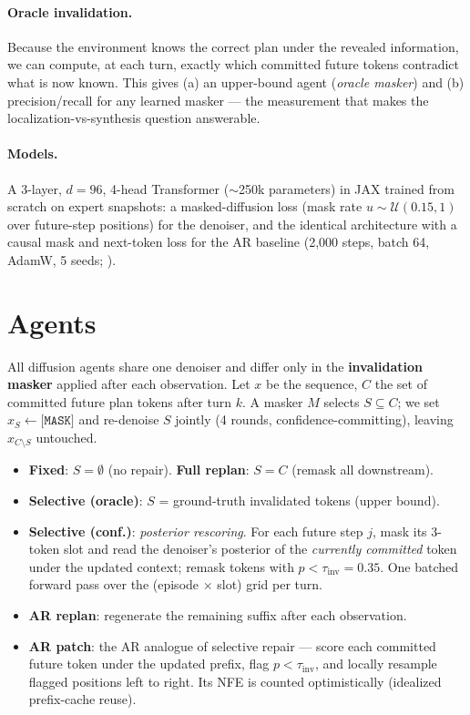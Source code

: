 \documentclass{article}
\newcommand{\tinv}{\tau_{\mathrm{inv}}}
\begin{document}
\paragraph{Oracle invalidation.} Because the environment knows the correct plan under the revealed
information, we can compute, at each turn, exactly which committed future tokens contradict what is
now known. This gives (a) an upper-bound agent (\emph{oracle masker}) and (b) precision/recall for
any learned masker --- the measurement that makes the localization-vs-synthesis question answerable.

\paragraph{Models.} A 3-layer, $d{=}96$, 4-head Transformer ($\sim$250k parameters) in JAX trained
from scratch on expert snapshots: a masked-diffusion loss (mask rate $u\!\sim\!\mathcal{U}(0.15,1)$
over future-step positions) for the denoiser, and the identical architecture with a causal mask and
next-token loss for the AR baseline (2{,}000 steps, batch 64, AdamW, 5 seeds; ).

\section{Agents}\label{sec:agents}

All diffusion agents share one denoiser and differ only in the \textbf{invalidation masker} applied
after each observation. Let $x$ be the sequence, $C$ the set of committed future plan tokens after
turn $k$. A masker $M$ selects $S\subseteq C$; we set $x_S \leftarrow \texttt{[MASK]}$ and re-denoise
$S$ jointly (4 rounds, confidence-committing), leaving $x_{C\setminus S}$ untouched.

\vspace{-0.3em}
\begin{itemize}\itemsep1pt \parskip0pt
\item \textbf{Fixed}: $S=\emptyset$ (no repair). \textbf{Full replan}: $S=C$ (remask all downstream).
\item \textbf{Selective (oracle)}: $S$ = ground-truth invalidated tokens (upper bound).
\item \textbf{Selective (conf.)}: \emph{posterior rescoring}. For each future step $j$, mask its
3-token slot and read the denoiser's posterior of the \emph{currently committed} token under the
updated context; remask tokens with $p<\tinv{=}0.35$. One batched forward pass over the
(episode $\times$ slot) grid per turn.
\item \textbf{AR replan}: regenerate the remaining suffix after each observation.
\item \textbf{AR patch}: the AR analogue of selective repair --- score each committed future token
under the updated prefix, flag $p<\tinv$, and locally resample flagged positions left to right. Its
NFE is counted optimistically (idealized prefix-cache reuse).
\end{itemize}
\vspace{-0.3em}
\end{document}
